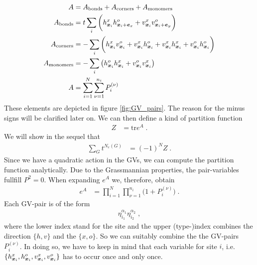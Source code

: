 \begin{subequations}\label{eq:}
\begin{align}
A &= A_\text{bonds}  + A_\text{corners}  + A_\text{monomers}\\
A_\text{bonds} &= t \sum_{i} \bigg( h^{x}_{\boldsymbol x_{i}} h^{o}_{\boldsymbol x_{i}+\boldsymbol e_{x} }
+ v^{x}_{\boldsymbol x_{i}} v^{o}_{\boldsymbol x_{i}+\boldsymbol e_{y}}\bigg)\\
A_\text{corners} &=  -\sum_{i} \bigg(h^{x}_{\boldsymbol x_{i}} v^{o}_{\boldsymbol x_{i}}+v^{x}_{\boldsymbol x_{i}} h^{o}_{\boldsymbol x_{i}}
+v^{x}_{\boldsymbol x_{i}} h^{x}_{\boldsymbol x_{i}} 
+v^{o}_{\boldsymbol x_{i}} h^{o}_{\boldsymbol x_{i}} 
\bigg)\\
A_\text{monomers} &=  -\sum_{i} \big(h^{o}_{\boldsymbol x_{i}}h^{x}_{\boldsymbol x_{i}}
+v^{o}_{\boldsymbol x_{i}} v^{x}_{\boldsymbol x_{i}}\big) \\
A&=\sum_{i=1}^{N}  \sum_{\nu=1}^{n_{i}} P_{i}^{(\nu)}
\end{align}
\end{subequations}
%
These elements are depicted in figure \ref{fig:GV_pairs}.
The reason for the minus signs will be clarified later on.
We can then define a kind of partition function
%
\begin{align*}
Z &= \text{tr} e^{A}\;.
\end{align*}
%
We will show in the sequel that 
%
\begin{align*}
\sum_{G} t^{N_{e}(G)} &= (-1)^{N} Z\;.
\end{align*}
%
Since we have a quadratic action in the GVs, we can compute the partition function analytically.
Due to the Grassmannian properties, the pair-variables fullfill $P^{2}=0$.
When expanding $e^{A}$ we, therefore, obtain
%
%
\begin{align*}
e^{A} &= \prod_{i=1}^{N}  \prod_{\nu=1}^{n_{i}} \big(1 + P_{i}^{(\nu)}\big)\;.
\end{align*}
%
Each GV-pair is of the form
%
\begin{align*}
\eta_{i_{1}}^{\alpha_{1}}\eta_{i_{2}}^{\alpha_{2}}\;,
\end{align*}
%
where the lower index stand for the site  and
the upper (type-)index combines the direction $\{h,v\}$ and the \mode $\{x,o\}$.
So we can suitably combine the the GV-pairs $P_{i}^{(\nu)} $. In doing so, we 
have to keep in mind that  each variable for site $i$, i.e.   
$\{h^{x}_{\boldsymbol x_{i}},h^{o}_{\boldsymbol x_{i}},v^{x}_{\boldsymbol x_{i}},v^{o}_{\boldsymbol x_{i}} \}$ has to occur once and  only once. 



